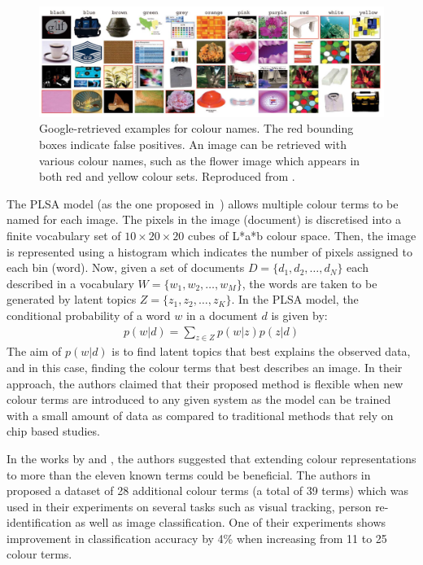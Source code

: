 \begin{figure}[hbt!]
 \centering
 \includegraphics[width=1\textwidth]{image/lit/van20091.PNG}
 \caption[Google-retrieved examples for colour names. The red bounding boxes
 indicate false positives. An image can be retrieved with various colour names,
 such as the flower image which appears in the red and the yellow
 set]{Google-retrieved examples for colour names. The red bounding boxes
 indicate false positives. An image can be retrieved with various colour names,
 such as the flower image which appears in both red and yellow colour sets.
 Reproduced from .}
 \label{fig:van20091}
\end{figure}

The PLSA model (as the one proposed in~\cite{van2009learning}) allows multiple colour terms to be named for each image. The pixels in the image (document) is discretised into a finite vocabulary set of $10 \times 20 \times 20$ cubes of L*a*b colour space. Then, the image is represented using a histogram which indicates the number of pixels assigned to each bin (word). Now, given a set of documents $D = \{d_1, d_2, \ldots, d_N\}$ each described in a vocabulary $W = \{w_1, w_2, \ldots, w_M\}$, the words are taken to be generated by latent topics $Z = \{z_1, z_2, \ldots, z_K\}$. In the PLSA model, the conditional probability of a word $w$ in a document $d$ is given by: 
\begin{align} 
    p(w|d) = \sum_{z\in Z}{p(w|z)p(z|d)}
\end{align} 
The aim of $p(w|d)$ is to find latent topics that best explains the observed data, and in this case, finding the colour terms that best describes an image. In their approach, the authors claimed that their proposed method is flexible when new colour terms are introduced to any given system as the model can be trained with a small amount of data as compared to traditional methods that rely on chip based studies.

In the works by  and , the authors suggested that extending colour representations to more than the eleven known terms could be beneficial. The authors in \cite{yu2018beyond} proposed a dataset of 28 additional colour terms (a total of 39 terms) which was used in their experiments on several tasks such as visual tracking, person re-identification as well as image classification. One of their experiments shows improvement in classification accuracy by 4\% when increasing from 11 to 25 colour terms.

